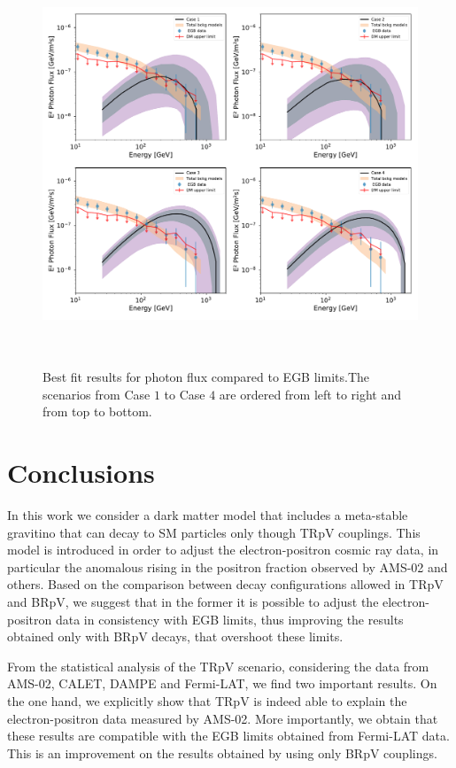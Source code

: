 \documentclass[a4paper,11pt]{article}
\begin{document}
\begin{figure}[htb]
\begin{center}
\includegraphics[height=12cm,width=14cm,angle=0]{Figures/pymultinest_fit_case_5_gamma_rays_EGB.pdf}
\caption{Best fit results for photon flux compared to EGB limits.The scenarios from Case $1$ to Case $4$ are ordered from left to right and from top to bottom.}
\label{fig:bf-photon-egb-spectrum}
\end{center}
\end{figure}

\section{Conclusions}
\label{sec:conclusions}

In this work we consider a dark matter model that includes a meta-stable gravitino that can decay to SM particles only though TRpV couplings. This model is introduced in order to adjust the electron-positron cosmic ray data, in particular the anomalous rising in the positron fraction observed by AMS-02 and others. Based on the comparison between decay configurations allowed in TRpV and BRpV, we suggest that in the former it is possible to adjust the electron-positron data in consistency with EGB limits, thus improving the results obtained only with BRpV decays, that overshoot these limits.

From the statistical analysis of the TRpV scenario, considering the data from AMS-02, CALET, DAMPE and Fermi-LAT, we find two important results. On the one hand, we explicitly show that TRpV is indeed able to explain the electron-positron data measured by AMS-02. More importantly, we obtain that these results are compatible with the EGB limits obtained from Fermi-LAT data. This is an improvement on the results obtained by using only BRpV couplings.
\end{document}
